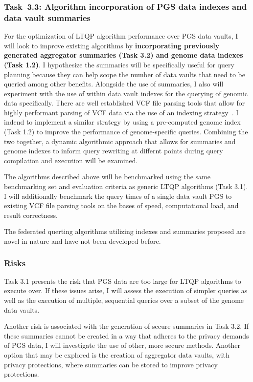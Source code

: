 \documentclass[a4paper,11pt]{article}
\begin{document}
\begin{refsection}
\newcommand\WPcc{Algorithm incorporation of PGS data indexes and data vault summaries}
\subsubsection{Task~3.3: \WPcc}

For the optimization of LTQP algorithm performance over PGS data vaults, I will look to improve existing algorithms by \textbf{incorporating previously generated aggregator summaries (Task 3.2) and genome data indexes (Task 1.2)}.
I hypothesize the summaries will be specifically useful for query planning because they can help scope the number of data vaults that need to be queried among other benefits. 
Alongside the use of summaries, I also will experiment with the use of within data vault indexes for the querying of genomic data specifically. 
There are well established VCF file parsing tools that allow for highly performant parsing of VCF data via the use of an indexing strategy~\cite{yang_seqminer2_2020}. 
I indend to implement a similar strategy by using a pre-computed genome index (Task 1.2) to improve the performance of genome-specific queries. 
Combining the two together, a dynamic algorithmic approach that allows for summaries and genome indexes to inform query rewriting at differnt points during query compilation and execution will be examined.  


The algorithms described above will be benchmarked using the same benchmarking set and evaluation criteria as generic LTQP algorithms (Task 3.1). 
I will additionally benchmark the query times of a single data vault PGS to existing VCF file parsing tools on the bases of speed, computational load, and result correctness.

The federated querting algorithms utilizing indexes and summaries proposed are novel in nature and have not been developed before. 

\subsubsection{Risks}
Task 3.1 presents the risk that PGS data are too large for LTQP algorithms to execute over. 
If these issues arise, I will assess the execution of simpler queries as well as the execution of multiple, sequential queries over a subset of the genome data vaults.

Another risk is associated with the generation of secure summaries in Task 3.2. 
If these summaries cannot be created in a way that adheres to the privacy demands of PGS data, I will investigate the use of other, more secure methods.
Another option that may be explored is the creation of aggregator data vaults, with privacy protections, where summaries can be stored to improve privacy protections.


\end{refsection}
\end{document}
